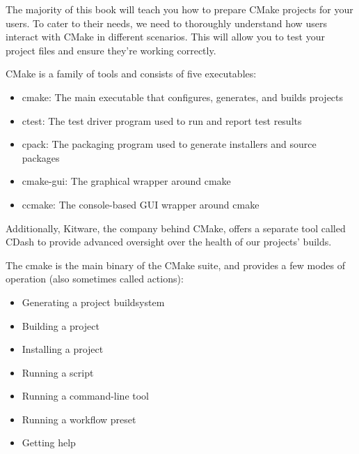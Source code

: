 The majority of this book will teach you how to prepare CMake projects for your users. To cater to their needs, we need to thoroughly understand how users interact with CMake in different scenarios. This will allow you to test your project files and ensure they’re working correctly.

CMake is a family of tools and consists of five executables:

\begin{itemize}
\item
cmake: The main executable that configures, generates, and builds projects

\item
ctest: The test driver program used to run and report test results

\item
cpack: The packaging program used to generate installers and source packages

\item
cmake-gui: The graphical wrapper around cmake

\item
ccmake: The console-based GUI wrapper around cmake
\end{itemize}

Additionally, Kitware, the company behind CMake, offers a separate tool called CDash to provide advanced oversight over the health of our projects’ builds.


The cmake is the main binary of the CMake suite, and provides a few modes of operation (also sometimes called actions):

\begin{itemize}
\item
Generating a project buildsystem

\item
Building a project

\item
Installing a project

\item
Running a script

\item
Running a command-line tool

\item
Running a workflow preset

\item
Getting help
\end{itemize}

